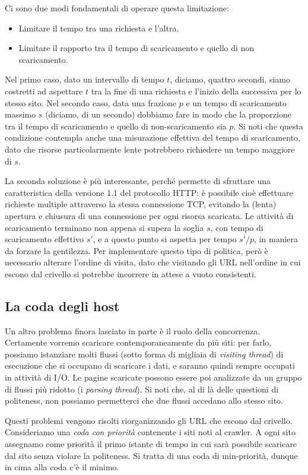 Ci sono due modi fondamentali di operare questa limitazione:
\begin{itemize}
    \item Limitare il tempo tra una richiesta e l'altra.
    \item Limitare il rapporto tra il tempo di scaricamento e quello di non scaricamento.
\end{itemize}
Nel primo caso, dato un intervallo di tempo $t$, diciamo, quattro secondi, siamo costretti ad aspettare $t$ tra la fine di una richiesta e l'inizio della successiva per lo stesso sito. Nel secondo caso, data una frazione $p$ e un tempo di scaricamento massimo $s$ (diciamo, di un secondo) dobbiamo fare in modo che la proporzione tra il tempo di scaricamento e quello di non-scaricamento sia $p$. Si noti che questa condizione contempla anche una misurazione effettiva del tempo di scaricamento, dato che risorse particolarmente lente potrebbero richiedere un tempo maggiore di $s$.

La seconda soluzione è più interessante, perché permette di sfruttare una caratteristica della versione 1.1 del protocollo HTTP: è possibile cioè effettuare richieste multiple attraverso la stessa connessione TCP, evitando la (lenta) apertura e chiusura di una connessione per ogni risorsa scaricata. Le attività di scaricamento terminano non appena si supera la soglia $s$, con tempo di scaricamento effettivo $s'$, e a questo punto si aspetta per tempo $s'/p$, in maniera da forzare la gentilezza.
Per implementare questo tipo di politica, però è necessario alterare l'ordine di visita, dato che visitando gli URL nell'ordine in cui escono dal crivello si potrebbe incorrere in attese a vuoto consistenti.
\subsection{La coda degli host}
Un altro problema finora lasciato in parte è il ruolo della concorrenza. Certamente vorremo scaricare contemporaneamente da più siti: per farlo, possiamo istanziare molti flussi (sotto forma di migliaia di \textit{visiting thread}) di esecuzione che si occupano di scaricare i dati, e saranno quindi sempre occupati in attività di I/O. Le pagine scaricate possono essere poi analizzate da un gruppo di flussi più ridotto (i \textit{parsing thread}). Si noti che, al di là delle questioni di politeness, non possiamo permetterci che due flussi accedano allo stesso sito.

Questi problemi vengono risolti riorganizzando gli URL che escono dal crivello. Consideriamo una \textit{coda con priorità} contenente i siti noti al crawler. A ogni sito assegnamo come priorità il primo istante di tempo in cui sarà possibile scaricare dal sito senza violare la politeness. Si tratta di una coda di min-priorità, dunque in cima alla coda c'è il minimo.

